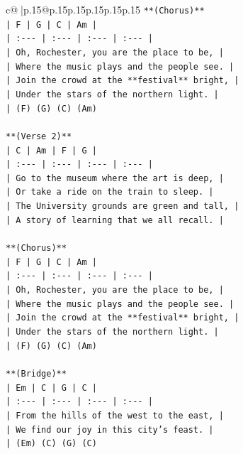 \documentclass{article}
\begin{document}
{\begin{supertabular}{c@{$\;$}|p{.15\linewidth}@{}p{.15\linewidth}p{.15\linewidth}p{.15\linewidth}p{.15\linewidth}p{.15\linewidth}}
{{{\texttt{**(Chorus)**} \\
\texttt{| F | G | C | Am |} \\
\texttt{| :{-}{-}{-} | :{-}{-}{-} | :{-}{-}{-} | :{-}{-}{-} |} \\
\texttt{| Oh, Rochester, you are the place to be, |} \\
\texttt{| Where the music plays and the people see. |} \\
\texttt{| Join the crowd at the **festival** bright, |} \\
\texttt{| Under the stars of the northern light. |} \\
\texttt{| (F) (G) (C) (Am)} \\
\\ 
\texttt{**(Verse 2)**} \\
\texttt{| C | Am | F | G |} \\
\texttt{| :{-}{-}{-} | :{-}{-}{-} | :{-}{-}{-} | :{-}{-}{-} |} \\
\texttt{| Go to the museum where the art is deep, |} \\
\texttt{| Or take a ride on the train to sleep. |} \\
\texttt{| The University grounds are green and tall, |} \\
\texttt{| A story of learning that we all recall. |} \\
\\ 
\texttt{**(Chorus)**} \\
\texttt{| F | G | C | Am |} \\
\texttt{| :{-}{-}{-} | :{-}{-}{-} | :{-}{-}{-} | :{-}{-}{-} |} \\
\texttt{| Oh, Rochester, you are the place to be, |} \\
\texttt{| Where the music plays and the people see. |} \\
\texttt{| Join the crowd at the **festival** bright, |} \\
\texttt{| Under the stars of the northern light. |} \\
\texttt{| (F) (G) (C) (Am)} \\
\\ 
\texttt{**(Bridge)**} \\
\texttt{| Em | C | G | C |} \\
\texttt{| :{-}{-}{-} | :{-}{-}{-} | :{-}{-}{-} | :{-}{-}{-} |} \\
\texttt{| From the hills of the west to the east, |} \\
\texttt{| We find our joy in this city's feast. |} \\
\texttt{| (Em) (C) (G) (C)} \\
}}}
\end{supertabular}}
\end{document}

